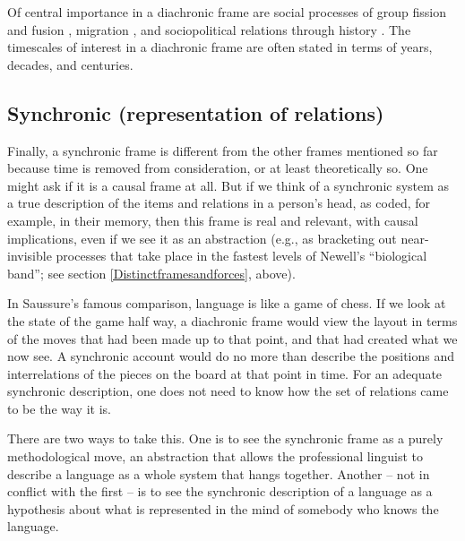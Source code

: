 Of central importance in a diachronic frame are social processes of 
group fission and fusion \citep{aureli_fission-fusion_2008}, migration \citep{manning_migration_2005}, and sociopolitical relations through history \citep{smith_inquiry_1776,marx_german_1947,runciman_theory_2009}. The timescales of interest in a 
diachronic frame are often stated in terms of years, decades, and 
centuries.



\subsection{Synchronic (representation of relations)}


Finally, a synchronic frame is different from the other frames mentioned 
so far because time is removed from consideration, or at least 
theoretically so. One might ask if it is a causal frame at all. But 
if we think of a synchronic system as a true description of the items 
and relations in a person's head, as coded, for example, in their 
memory, then this frame is real and relevant, with causal implications, 
even if we see it as an abstraction (e.g., as bracketing out 
near-invisible processes that take place in the fastest levels of 
Newell's ``biological band''; see section \ref{Distinctframesandforces}, above). 



In Saussure's famous comparison, language is like a game of chess. If we 
look at the state of the game half way, a diachronic frame 
would view the layout in terms of the moves that had been made up 
to that point, and that had created what we now see. A 
synchronic account would do no more than describe the positions and 
interrelations of the pieces on the board at that point in time. For an 
adequate synchronic description, one does not need to know how the set 
of relations came to be the way it is. 



There are two ways to take this. One is to see the synchronic frame as a purely 
methodological move, an abstraction that allows the professional 
linguist to describe a language as a whole system that hangs together. 
Another -- not in conflict with the first -- is to see the 
synchronic description of a language as a hypothesis about what is 
represented in the mind of somebody who knows the language. 



